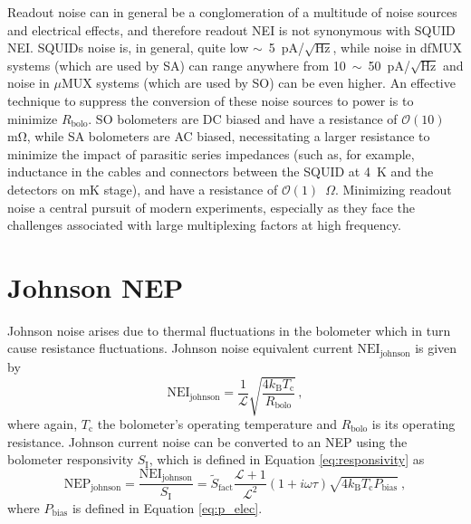 Readout noise can in general be a conglomeration of a multitude of noise sources and electrical effects, and therefore readout NEI is not synonymous with SQUID NEI. SQUIDs noise is, in general, quite low $\sim$~5~pA/$\mathrm{\sqrt{Hz}}$, while noise in dfMUX systems (which are used by SA) can range anywhere from 10~$\sim$~50~pA/$\mathrm{\sqrt{Hz}}$ and noise in $\mu$MUX systems (which are used by SO) can be even higher. An effective technique to suppress the conversion of these noise sources to power is to minimize $R_{\mathrm{bolo}}$. SO bolometers are DC biased and have a resistance of $\mathcal{O}(10)$~$\mathrm{m \Omega}$, while SA bolometers are AC biased, necessitating a larger resistance to minimize the impact of parasitic series impedances (such as, for example, inductance in the cables and connectors between the SQUID at 4~K and the detectors on mK stage), and have a resistance of $\mathcal{O}(1)$~$\Omega$. Minimizing readout noise a central pursuit of modern experiments, especially as they face the challenges associated with large multiplexing factors at high frequency.


\section{Johnson NEP}
\label{sec:johnson_noise}

Johnson noise arises due to thermal fluctuations in the bolometer which in turn cause resistance fluctuations. Johnson noise equivalent current $\mathrm{NEI}_{\mathrm{johnson}}$ is given by
\begin{equation}
    \mathrm{NEI}_{\mathrm{johnson}} = \frac{1}{\mathcal{L}} \sqrt{\frac{4 k_{\mathrm{B}} T_{\mathrm{c}}}{R_{\mathrm{bolo}}}} \, ,
    \label{eq:nei_johnson}
\end{equation}
where again, $T_{\mathrm{c}}$ the bolometer's operating temperature and $R_{\mathrm{bolo}}$ is its operating resistance. Johnson current noise can be converted to an NEP using the bolometer responsivity $S_{\mathrm{I}}$, which is defined in Equation \ref{eq:responsivity} as
\begin{equation}
    \mathrm{NEP}_{\mathrm{johnson}} = \frac{\mathrm{NEI}_{\mathrm{johnson}}}{S_{\mathrm{I}}} = \tilde{S}_{\mathrm{fact}} \frac{\mathcal{L} + 1}{\mathcal{L}^{2}} \left( 1 + i \omega \tau \right) \sqrt{4 k_{\mathrm{B}} T_{\mathrm{c}} P_{\mathrm{bias}}} \:,
    \label{eq:nep_johnson}
\end{equation}
where $P_{\mathrm{bias}}$ is defined in Equation \ref{eq:p_elec}. 

